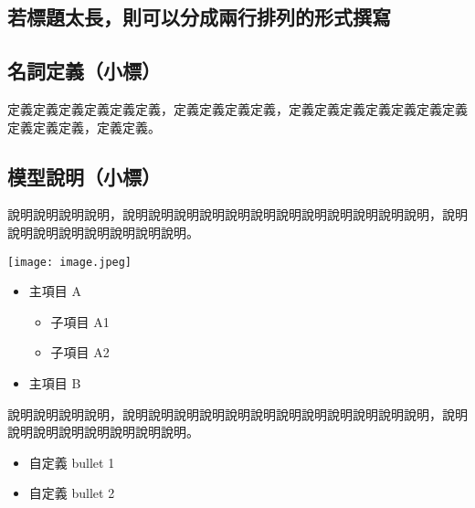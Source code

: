 \begin{ZhChapter}

\chapter{若標題太長，則可以分成兩行排列的形式撰寫}

\section{名詞定義（小標）}

定義定義定義定義定義定義\cite{latex2e}，定義定義定義定義，定義定義定義定義定義定義定義定義定義定義，定義定義。

\begin{table*}[htbp]
    \centering
    \caption{表格範例標題} \label{tab: complexity}
\end {table*}

\section{模型說明（小標）}

說明說明說明說明，說明說明說明說明說明說明說明說明說明說明說明說明，說明說明說明說明說明說明說明說明。

\begin{figure*}[htbp]
    \centering
    \texttt{[image: image.jpeg]}
    \caption{Cool train station}
    \label{fig: image}
\end{figure*}

\begin{itemize}
    \item 主項目 A
    \begin{itemize}
        \item 子項目 A1
        \item 子項目 A2
    \end{itemize}
    \item 主項目 B
\end{itemize}

說明說明說明說明，說明說明說明說明說明說明說明說明說明說明說明說明，說明說明說明說明說明說明說明說明。

\begin{itemize}[label=--] %
    \item 自定義 bullet 1
    \item 自定義 bullet 2
\end{itemize}

\end{ZhChapter}